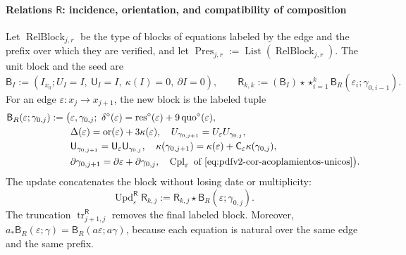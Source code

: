 \paragraph{Relations \(\mathsf R\): incidence, orientation, and compatibility of composition}
Let \(\operatorname{RelBlock}_{j,r}\) be the type of blocks of equations
labeled by the edge and the prefix over which they are verified, and let
\(\operatorname{Pres}_{j,r}:=\operatorname{List}
(\operatorname{RelBlock}_{j,r})\). The unit block and the seed are
\begin{equation}
\label{eq:pdfv2-terminal-semilla-r}
 \mathsf B_I:=(I_{x_0};U_I=I,\ \mathsf U_I=I,\ \kappa(I)=0,\ \partial I=0),
 \qquad
 \mathsf R_{k,k}:=(\mathsf B_I)\star
 \mathop{\star}_{i=1}^{k}
 \mathsf B_R(\varepsilon_i;\gamma_{0,i-1}).
\end{equation}
For an edge \(\varepsilon:x_j\to x_{j+1}\), the new block is the
labeled tuple
\begin{equation}
\label{eq:pdfv2-terminal-bloque-r}
 \begin{split}
 \mathsf B_R(\varepsilon;\gamma_{0,j}):=\bigl(
 &\varepsilon,\gamma_{0,j};\ 
 \delta^\diamond(\varepsilon)
 =\operatorname{res}^\diamond(\varepsilon)
  +9\operatorname{quo}^\diamond(\varepsilon),\\
 &\Delta(\varepsilon)=\operatorname{or}(\varepsilon)
  +3\kappa(\varepsilon),\quad
 U_{\gamma_{0,j+1}}=U_\varepsilon U_{\gamma_{0,j}},\\
 &\mathsf U_{\gamma_{0,j+1}}
 =\mathsf U_\varepsilon\mathsf U_{\gamma_{0,j}},\quad
 \kappa(\gamma_{0,j+1})
 =\kappa(\varepsilon)+\mathsf C_\varepsilon\kappa(\gamma_{0,j}),\\
 &\partial\gamma_{0,j+1}
 =\partial\varepsilon+\partial\gamma_{0,j},\quad
 \operatorname{Cpl}_\varepsilon
 \text{ of }\eqref{eq:pdfv2-cor-acoplamientos-unicos}
 \bigr).
 \end{split}
\end{equation}
The update concatenates the block without losing date or multiplicity:
\begin{equation}
\label{eq:pdfv2-terminal-update-r}
 \operatorname{Upd}^{\mathsf R}_{\varepsilon}\mathsf R_{k,j}
 :=\mathsf R_{k,j}\star\mathsf B_R(\varepsilon;\gamma_{0,j}).
\end{equation}
The truncation \(\operatorname{tr}^{\mathsf R}_{j+1,j}\) removes the final
labeled block. Moreover,
\(a_*\mathsf B_R(\varepsilon;\gamma)
=\mathsf B_R(a\varepsilon;a\gamma)\), because each equation is natural over
the same edge and the same prefix.

